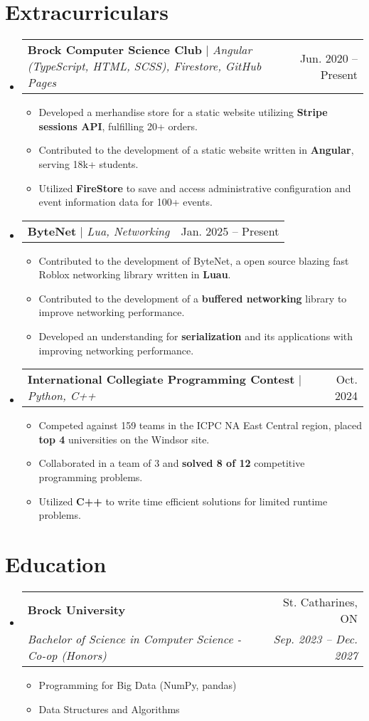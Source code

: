 \documentclass[letterpaper,11pt]{article}
\makeatletter
\newcommand{\resumeItem}[1]{
  \item\small{
    {#1 \vspace{-2pt}}
  }
}
\newcommand{\resumeSubheading}[4]{
  \vspace{-2pt}\item
    \begin{tabular*}{0.97\textwidth}[t]{l@{\extracolsep{\fill}}r}
      \textbf{#1} & #2 \\
      \textit{\small#3} & \textit{\small #4} \\
    \end{tabular*}\vspace{-7pt}
}
\newcommand{\resumeProjectHeading}[2]{
    \item
    \begin{tabular*}{0.97\textwidth}{l@{\extracolsep{\fill}}r}
      \small#1 & #2 \\
    \end{tabular*}\vspace{-7pt}
}
\newcommand{\resumeSubHeadingListStart}{\begin{itemize}[leftmargin=0.15in, label={}]}
\newcommand{\resumeSubHeadingListEnd}{\end{itemize}}
\newcommand{\resumeItemListStart}{\begin{itemize}}
\newcommand{\resumeItemListEnd}{\end{itemize}\vspace{-5pt}}
\makeatother
\begin{document}
\section{Extracurriculars}
    \resumeSubHeadingListStart
      \resumeProjectHeading
          {\textbf{Brock Computer Science Club} $|$ \emph{Angular (TypeScript, HTML, SCSS), Firestore, GitHub Pages}}{Jun. 2020 -- Present}
          \resumeItemListStart
            \resumeItem{Developed a merhandise store for a static website utilizing \textbf{Stripe sessions API}, fulfilling 20+ orders.}
            \resumeItem{Contributed to the development of a static website written in \textbf{Angular}, serving 18k+ students.}
            \resumeItem{Utilized \textbf{FireStore} to save and access administrative configuration and event information data for 100+ events.}
          \resumeItemListEnd
      \resumeProjectHeading
        {\textbf{ByteNet} $|$ \emph{Lua, Networking}}{Jan. 2025 -- Present}
        \resumeItemListStart
          \resumeItem{Contributed to the development of ByteNet, a open source blazing fast Roblox networking library written in \textbf{Luau}.}
          \resumeItem{Contributed to the development of a \textbf{buffered networking} library to improve networking performance.}
          \resumeItem{Developed an understanding for \textbf{serialization} and its applications with improving networking performance.}
        \resumeItemListEnd
      \resumeProjectHeading
          {\textbf{International Collegiate Programming Contest} $|$ \emph{Python, C++}}{Oct. 2024}
          \resumeItemListStart
            \resumeItem{Competed against 159 teams in the ICPC NA East Central region, placed \textbf{top 4} universities on the Windsor site.}
            \resumeItem{Collaborated in a team of 3 and \textbf{solved 8 of 12} competitive programming problems.}
            \resumeItem{Utilized \textbf{C++} to write time efficient solutions for limited runtime problems.}
          \resumeItemListEnd
    \resumeSubHeadingListEnd
%

\section{Education}
  \resumeSubHeadingListStart
    \resumeSubheading
      {Brock University}{St. Catharines, ON}
      {Bachelor of Science in Computer Science - Co-op (Honors)}{Sep. 2023 -- Dec. 2027}
    \resumeItemListStart
      \resumeItem{Programming for Big Data (NumPy, pandas)}
      \resumeItem{Data Structures and Algorithms}
    \resumeItemListEnd
  \resumeSubHeadingListEnd
%
\end{document}
